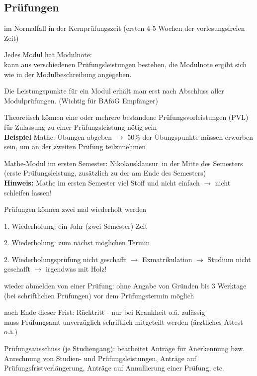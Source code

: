 \documentclass[a4paper,12pt]{report}
\begin{document}
\subsection{Prüfungen}
\begin{itemize*}
    \item im Normalfall in der Kernprüfungszeit (ersten 4-5 Wochen der vorlesungsfreien Zeit)
    \item Jedes Modul hat Modulnote:\\
        kann aus verschiedenen Prüfungsleistungen bestehen, die Modulnote ergibt sich wie in der Modulbeschreibung angegeben.
    \item Die Leistungspunkte für ein Modul erhält man erst nach Abschluss aller Modulprüfungen. (Wichtig für BAföG Empfänger)
    \item Theoretisch können eine oder mehrere bestandene Prüfungsvorleistungen (PVL) für Zulassung zu einer Prüfungsleistung nötig sein\\
        \textbf{Beispiel} Mathe: Übungen abgeben $\rightarrow$ 50\% der Übungspunkte müssen erworben sein, um an der zweiten Prüfung teilzunehmen
    \item Mathe-Modul im ersten Semester: \glqq Nikolausklausur\grqq\ in der Mitte des Semesters (erste Prüfungsleistung, zusätzlich zu der am Ende des Semesters)\\
    \textbf{Hinweis:} Mathe im ersten Semester viel Stoff und nicht einfach $\rightarrow$ nicht schleifen lassen!
    \item Prüfungen können zwei mal wiederholt werden
    \begin{itemize*}
        \item 1. Wiederholung: ein Jahr (zwei Semester) Zeit
        \item 2. Wiederholung: zum nächst möglichen Termin
    \end{itemize*}
    2. Wiederholungsprüfung nicht geschafft $\rightarrow$ Exmatrikulation $\rightarrow$ Studium nicht geschafft $\rightarrow$ irgendwas mit Holz!
    \item wieder abmelden von einer Prüfung: ohne Angabe von Gründen bis 3 Werktage (bei schriftlichen Prüfungen) vor dem Prüfungstermin möglich
    \item nach Ende dieser Frist: Rücktritt - nur bei Krankheit o.ä. zulässig\\
        muss Prüfungsamt unverzüglich schriftlich mitgeteilt werden (ärztliches Attest o.ä.)
    \item Prüfungsausschuss (je Studiengang): bearbeitet Anträge für Anerkennung bzw. Anrechnung von Studien- und Prüfungsleistungen, Anträge auf Prüfungsfristverlängerung, Anträge auf Annullierung einer Prüfung, etc.

\end{itemize*}
\end{document}
